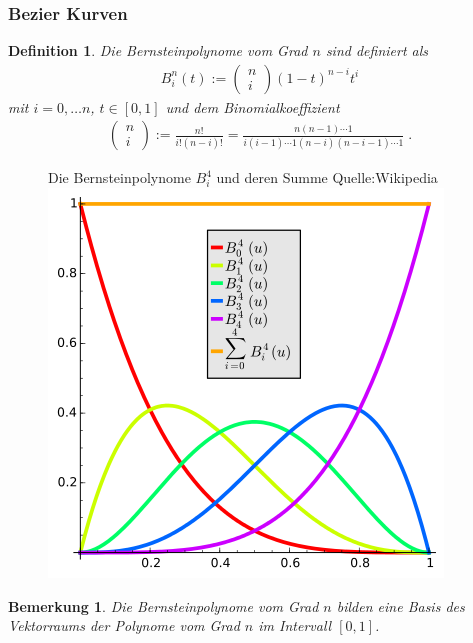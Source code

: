 \documentclass[]{article}
\newtheorem{Definition}{Definition}
\newtheorem{Bemerkung}{Bemerkung}
\begin{document}
\subsubsection{Bezier Kurven}
\begin{Definition}
Die Bernsteinpolynome vom Grad $n$ sind definiert als
\begin{align*}
B_i^n(t) := \begin{pmatrix} n \\ i \end{pmatrix} (1-t)^{n-i}t^i
\end{align*}
mit $i = 0, \hdots n$, $t \in [0,1]$ und dem Binomialkoeffizient
\begin{align*}
\begin{pmatrix} n \\ i \end{pmatrix} := \frac{n!}{i!(n-i)!} = \frac{n(n-1) \cdots 1}{i(i-1) \cdots 1 (n-i) (n-i-1) \cdots 1 } \; .
\end{align*}
\end{Definition}

\begin{figure}[H]
\centering
Die Bernsteinpolynome $B^{4}_i$ und deren Summe Quelle:Wikipedia \\
\includegraphics[scale=0.8]{Bernstein_Polynomials.png}
\end{figure}

\begin{Bemerkung}
Die Bernsteinpolynome vom Grad $n$ bilden eine Basis des Vektorraums der Polynome vom Grad $n$ im Intervall $[0,1]$.
\end{Bemerkung}
\end{document}
